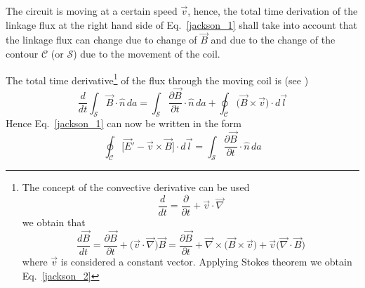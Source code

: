 \documentclass[12pt,a4paper,oneside]{book}
\begin{document}
\begin{onehalfspace}
The circuit is moving at a certain speed $\vec{v}$, hence, the total time 
derivation of the linkage flux at the right hand side of Eq.~\ref{jackson_1} 
shall take into account that the linkage flux can change due to change of 
$\vec{B}$ and due to the change of the contour $\mathcal{C}$ (or $\mathcal{S}$) 
due to the movement of the coil. 


The total time derivative\footnote{
	The concept of the convective derivative can be used \begin{equation*}
		\frac{d}{dt} = \frac{\partial}{\partial t} + \vec{v}\cdot\vec{\nabla}
	\end{equation*}
	we obtain that
	\begin{equation*}
		\frac{d\vec{B}}{dt} = \frac{\partial\vec{B}}{\partial t} + 
		\Big(\vec{v}\cdot\vec{\nabla}\Big)\vec{B} = \frac{\partial 
		\vec{B}}{\partial 
		t}+\vec{\nabla}\times\Big(\vec{B}\times\vec{v}\Big)+\vec{v}\Big(\vec{\nabla}\cdot\vec{B}\Big)
	\end{equation*}
	where $\vec{v}$ is considered a constant vector. Applying Stokes theorem we 
	obtain Eq.~\ref{jackson_2}
} of the flux through the moving coil is (see \cite{p14})
\begin{equation}\label{jackson_2}
	\frac{d}{dt}\int_\mathcal{S}\vec{B}\cdot\hat{n}\,da = 
	\int_\mathcal{S}\frac{\partial\vec{B}}{\partial t}\cdot\hat{n}\,da + 
	\oint_\mathcal{C}\Big(\vec{B}\times\vec{v}\Big)\cdot d\vec{l}
\end{equation}
Hence Eq.~\ref{jackson_1} can now be written in the form
\begin{equation}\label{jackson_3}
	\oint_\mathcal{C}\Big[\vec{E}'-\vec{v}\times\vec{B}\Big]\cdot d\vec{l} = 
	\int_\mathcal{S}\frac{\partial\vec{B}}{\partial t}\cdot\hat{n}\,da
\end{equation}


\end{onehalfspace}
\end{document}
